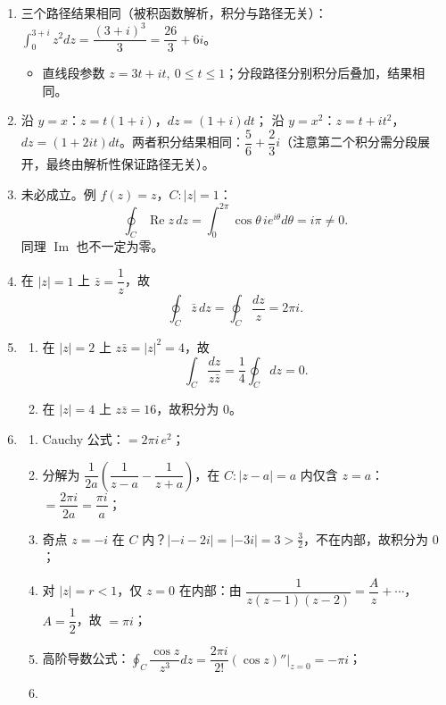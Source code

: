 \begin{enumerate}
\def\labelenumi{\arabic{enumi}.}
\item
  三个路径结果相同（被积函数解析，积分与路径无关）：\(\displaystyle\int_0^{3+i}z^2dz=\dfrac{(3+i)^3}{3}=\dfrac{26}{3}+6i\)。

  \begin{itemize}
  \tightlist
  \item
    直线段参数
    \(z=3t+it,\ 0\le t\le1\)；分段路径分别积分后叠加，结果相同。
  \end{itemize}
\item
  沿 \(y=x\)：\(z=t(1+i)\)，\(dz=(1+i)dt\)； 沿
  \(y=x^2\)：\(z=t+it^2\)，\(dz=(1+2it)dt\)。两者积分结果相同：\(\dfrac{5}{6}+\dfrac{2}{3}i\)（注意第二个积分需分段展开，最终由解析性保证路径无关）。
\item
  未必成立。例 \(f(z)=z\)，\(C:|z|=1\)： \[
  \oint_C \operatorname{Re}z\,dz=\int_0^{2\pi}\cos\theta\,ie^{i\theta}d\theta=i\pi\neq0 .
  \] 同理 \(\operatorname{Im}\) 也不一定为零。
\item
  在 \(|z|=1\) 上 \(\bar z=\dfrac1z\)，故 \[
  \oint_C \bar z\,dz=\oint_C\dfrac{dz}{z}=2\pi i .
  \]
\item
  \begin{enumerate}
  \def\labelenumii{(\arabic{enumii})}
  \tightlist
  \item
    在 \(|z|=2\) 上 \(z\bar z=|z|^2=4\)，故 \[
    \int_C\dfrac{dz}{z\bar z}=\dfrac14\oint_C dz=0 .
    \]
  \item
    在 \(|z|=4\) 上 \(z\bar z=16\)，故积分为 \(0\)。
  \end{enumerate}
\item
  \begin{enumerate}
  \def\labelenumii{(\arabic{enumii})}
  \tightlist
  \item
    Cauchy 公式：\(=2\pi i\,e^2\)；
  \item
    分解为 \(\dfrac{1}{2a}\left(\dfrac1{z-a}-\dfrac1{z+a}\right)\)，在
    \(C:|z-a|=a\) 内仅含
    \(z=a\)：\(=\dfrac{2\pi i}{2a}=\dfrac{\pi i}{a}\)；
  \item
    奇点 \(z=-i\) 在 \(C\)
    内？\(|{-i}-2i|=|{-3i}|=3>\frac32\)，不在内部，故积分为 \(0\)；
  \item
    对 \(|z|=r<1\)，仅 \(z=0\) 在内部：由
    \(\dfrac1{z(z-1)(z-2)}=\dfrac{A}{z}+\cdots\)，\(A=\dfrac1{2}\)，故
    \(=\pi i\)；
  \item
    高阶导数公式：\(\oint_C\dfrac{\cos z}{z^3}dz=\dfrac{2\pi i}{2!}(\cos z)''\big|_{z=0}=-\pi i\)；
  \item

\end{enumerate}
\end{enumerate}
